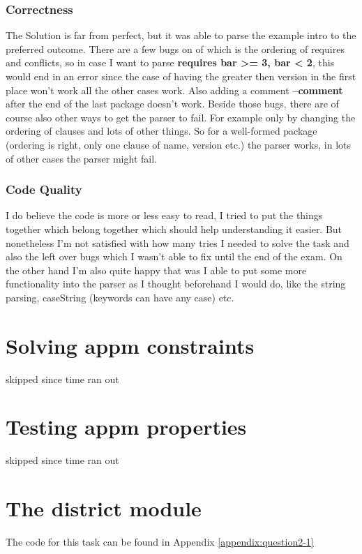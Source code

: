 \documentclass[11pt,a4paper]{article}
\begin{document}
\subsubsection{Correctness}
The Solution is far from perfect, but it was able to parse the example intro to the preferred outcome.
There are a few bugs on of which is the ordering of requires and conflicts, so in case I want to parse \textbf{requires bar >= 3, bar < 2}, this would end in an error since the case of having the greater then version in the first place won't work all the other cases work.
Also adding a comment \textbf{--comment} after the end of the last package doesn't work.
Beside those bugs, there are of course also other ways to get the parser to fail.
For example only by changing the ordering of clauses and lots of other things.
So for a well-formed package (ordering is right, only one clause of name, version etc.) the parser works, in lots of other cases the parser might fail.

\subsubsection{Code Quality}
I do believe the code is more or less easy to read, I tried to put the things together which belong together which should help understanding it easier.
But nonetheless I'm not satisfied with how many tries I needed to solve the task and also the left over bugs which I wasn't able to fix until the end of the exam.
On the other hand I'm also quite happy that was I able to put some more functionality into the parser as I thought beforehand I would do, like the string parsing, caseString (keywords can have any case) etc.

\section{Solving appm constraints}
skipped since time ran out
\section{Testing appm properties}
skipped since time ran out

\section{The district module}
The code for this task can be found in Appendix \ref{appendix:question2-1}
\end{document}
